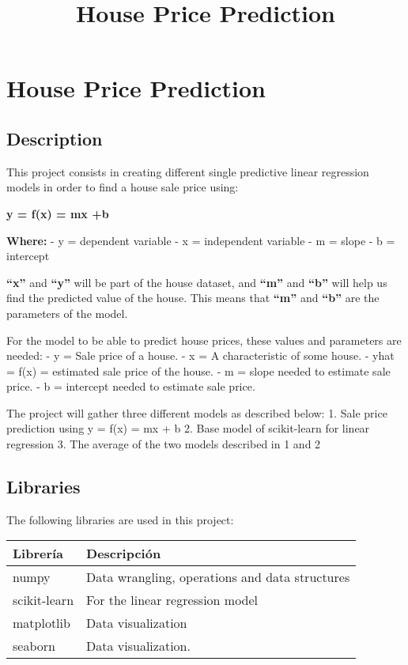 \documentclass[11pt]{article}
\title{House Price Prediction}
\begin{document}
    
    
    \maketitle
    
    

    
    \hypertarget{house-price-prediction}{%
\section{House Price Prediction}\label{house-price-prediction}}

    \hypertarget{description}{%
\subsection{Description}\label{description}}

This project consists in creating different single predictive linear
regression models in order to find a house sale price using:

\textbf{y = f(x) = mx +b}

\textbf{Where:} - y = dependent variable - x = independent variable - m
= slope - b = intercept

\textbf{``x''} and \textbf{``y''} will be part of the house dataset, and
\textbf{``m''} and \textbf{``b''} will help us find the predicted value
of the house. This means that \textbf{``m''} and \textbf{``b''} are the
parameters of the model.

    For the model to be able to predict house prices, these values and
parameters are needed: - y = Sale price of a house. - x = A
characteristic of some house. - yhat = f(x) = estimated sale price of
the house. - m = slope needed to estimate sale price. - b = intercept
needed to estimate sale price.

    The project will gather three different models as described below: 1.
Sale price prediction using y = f(x) = mx + b 2. Base model of
scikit-learn for linear regression 3. The average of the two models
described in 1 and 2

    \hypertarget{libraries}{%
\subsection{Libraries}\label{libraries}}

The following libraries are used in this project:

\begin{longtable}[]{@{}ll@{}}
\toprule
Librería & Descripción\tabularnewline
\midrule
\endhead
numpy & Data wrangling, operations and data structures\tabularnewline
scikit-learn & For the linear regression model\tabularnewline
matplotlib & Data visualization\tabularnewline
seaborn & Data visualization.\tabularnewline
\bottomrule
\end{longtable}
\end{document}
